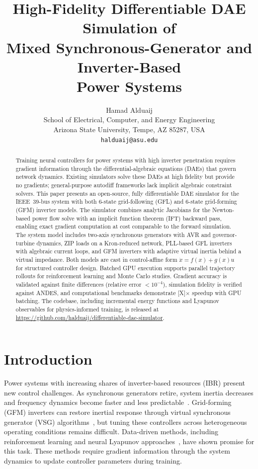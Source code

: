 \documentclass[11pt]{article}
\title{High-Fidelity Differentiable DAE Simulation of\\
Mixed Synchronous-Generator and Inverter-Based\\Power Systems}
\author{
Hamad Alduaij\\
School of Electrical, Computer, and Energy Engineering\\
Arizona State University, Tempe, AZ 85287, USA\\
\texttt{halduaij@asu.edu}
}
\date{}
\begin{document}
\maketitle

\begin{abstract}
Training neural controllers for power systems with high inverter penetration
requires gradient information through the differential-algebraic equations
(DAEs) that govern network dynamics.  Existing simulators solve these DAEs
at high fidelity but provide no gradients; general-purpose autodiff
frameworks lack implicit algebraic constraint solvers.  This paper presents
an open-source, fully differentiable DAE simulator for the IEEE~39-bus
system with both 6-state grid-following (GFL) and 6-state grid-forming
(GFM) inverter models.  The simulator combines analytic Jacobians for the
Newton-based power flow solve with an implicit function theorem (IFT)
backward pass, enabling exact gradient computation at cost comparable to the
forward simulation.  The system model includes two-axis synchronous
generators with AVR and governor-turbine dynamics, ZIP loads on a
Kron-reduced network, PLL-based GFL inverters with algebraic current loops,
and GFM inverters with adaptive virtual inertia behind a virtual impedance.
Both models are cast in control-affine form $\dot{x} = f(x) + g(x)u$ for
structured controller design.  Batched GPU execution supports parallel
trajectory rollouts for reinforcement learning and Monte Carlo studies.
Gradient accuracy is validated against finite differences (relative error
$< 10^{-4}$), simulation fidelity is verified against ANDES, and
computational benchmarks demonstrate [X]$\times$ speedup with GPU batching.
The codebase, including incremental energy functions and Lyapunov
observables for physics-informed training, is released at
\url{https://github.com/halduaij/differentiable-dae-simulator}.

\end{abstract}

\section{Introduction}
\label{sec:intro}

Power systems with increasing shares of inverter-based resources (IBR)
present new control challenges.  As synchronous generators retire,
system inertia decreases and frequency dynamics become faster and less
predictable~\cite{Milano18LowInertiaReview, NREL21GFMRoadmap}.
Grid-forming (GFM) inverters can restore inertial response through
virtual synchronous generator (VSG)
algorithms~\cite{Zhong11Synchronverters, Bevrani14VSGSurvey}, but
tuning these controllers across heterogeneous operating conditions
remains difficult.  Data-driven methods, including reinforcement
learning and neural Lyapunov
approaches~\cite{CuiZhang23Lyapunov, Shuai25SafeRL, Feng24VariableInertia},
have shown promise for this task.  These methods require
gradient information through the system dynamics to update controller
parameters during training.
\end{document}
